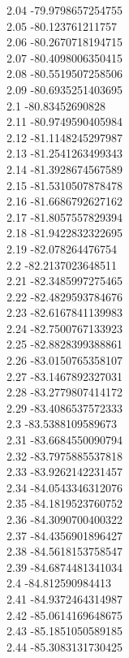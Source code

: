 {2.04	-79.9798657254755\\
2.05	-80.123761211757\\
2.06	-80.2670718194715\\
2.07	-80.4098006350415\\
2.08	-80.5519507258506\\
2.09	-80.6935251403695\\
2.1	-80.83452690828\\
2.11	-80.9749590405984\\
2.12	-81.1148245297987\\
2.13	-81.2541263499343\\
2.14	-81.3928674567589\\
2.15	-81.5310507878478\\
2.16	-81.6686792627162\\
2.17	-81.8057557829394\\
2.18	-81.9422832322695\\
2.19	-82.078264476754\\
2.2	-82.2137023648511\\
2.21	-82.3485997275465\\
2.22	-82.4829593784676\\
2.23	-82.6167841139983\\
2.24	-82.7500767133923\\
2.25	-82.8828399388861\\
2.26	-83.0150765358107\\
2.27	-83.1467892327031\\
2.28	-83.2779807414172\\
2.29	-83.4086537572333\\
2.3	-83.5388109589673\\
2.31	-83.6684550090794\\
2.32	-83.7975885537818\\
2.33	-83.9262142231457\\
2.34	-84.0543346312076\\
2.35	-84.1819523760752\\
2.36	-84.3090700400322\\
2.37	-84.4356901896427\\
2.38	-84.5618153758547\\
2.39	-84.6874481341034\\
2.4	-84.812590984413\\
2.41	-84.9372464314987\\
2.42	-85.0614169648675\\
2.43	-85.1851050589185\\
2.44	-85.3083131730425\\
}
